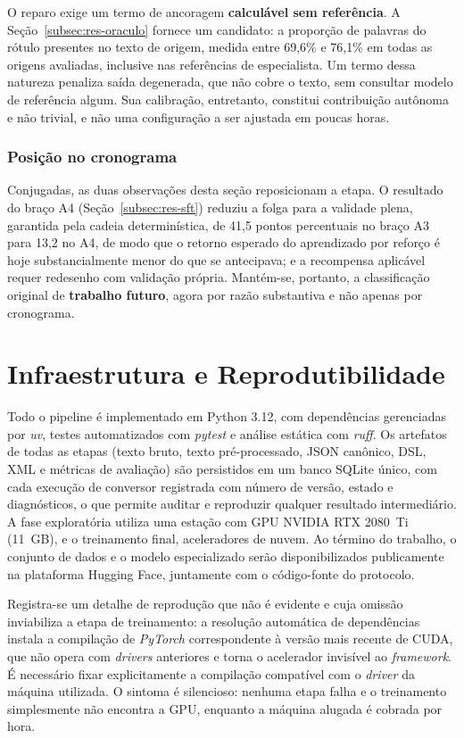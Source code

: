 O reparo exige um termo de ancoragem \textbf{calculável sem referência}. A Seção~\ref{subsec:res-oraculo} fornece um candidato: a proporção de palavras do rótulo presentes no texto de origem, medida entre 69,6\% e 76,1\% em todas as origens avaliadas, inclusive nas referências de especialista. Um termo dessa natureza penaliza saída degenerada, que não cobre o texto, sem consultar modelo de referência algum. Sua calibração, entretanto, constitui contribuição autônoma e não trivial, e não uma configuração a ser ajustada em poucas horas.

\subsubsection*{Posição no cronograma}

Conjugadas, as duas observações desta seção reposicionam a etapa. O resultado do braço A4 (Seção~\ref{subsec:res-sft}) reduziu a folga para a validade plena, garantida pela cadeia determinística, de 41,5 pontos percentuais no braço A3 para 13,2 no A4, de modo que o retorno esperado do aprendizado por reforço é hoje substancialmente menor do que se antecipava; e a recompensa aplicável requer redesenho com validação própria. Mantém-se, portanto, a classificação original de \textbf{trabalho futuro}, agora por razão substantiva e não apenas por cronograma.

\section{Infraestrutura e Reprodutibilidade}
\label{sec:reprodutibilidade}

Todo o pipeline é implementado em Python 3.12, com dependências gerenciadas por \textit{uv}, testes automatizados com \textit{pytest} e análise estática com \textit{ruff}. Os artefatos de todas as etapas (texto bruto, texto pré-processado, JSON canônico, DSL, XML e métricas de avaliação) são persistidos em um banco SQLite único, com cada execução de conversor registrada com número de versão, estado e diagnósticos, o que permite auditar e reproduzir qualquer resultado intermediário. A fase exploratória utiliza uma estação com GPU NVIDIA RTX 2080~Ti (11~GB), e o treinamento final, aceleradores de nuvem. Ao término do trabalho, o conjunto de dados e o modelo especializado serão disponibilizados publicamente na plataforma Hugging Face, juntamente com o código-fonte do protocolo.

Registra-se um detalhe de reprodução que não é evidente e cuja omissão inviabiliza a etapa de treinamento: a resolução automática de dependências instala a compilação de \textit{PyTorch} correspondente à versão mais recente de CUDA, que não opera com \textit{drivers} anteriores e torna o acelerador invisível ao \textit{framework}. É necessário fixar explicitamente a compilação compatível com o \textit{driver} da máquina utilizada. O sintoma é silencioso: nenhuma etapa falha e o treinamento simplesmente não encontra a GPU, enquanto a máquina alugada é cobrada por hora.
